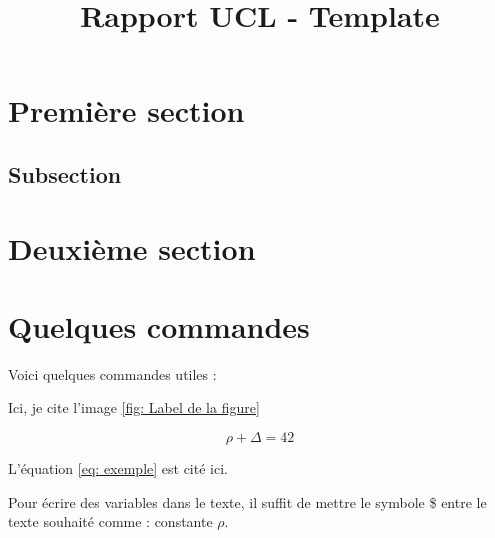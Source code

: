 \documentclass{rapport}
\title{Rapport UCL - Template} %
\begin{document}



        
\fairemarges %
\fairepagedegarde %
\tableofcontents%
\newpage



\section{Première section} 

\lipsum[3-4]%

\subsection{Subsection}

\lipsum[3-4] %

\section{Deuxième section}

\lipsum[3-5] %


\section{Quelques commandes}

Voici quelques commandes utiles :


Ici, je cite l'image \ref{fig: Label de la figure}



\begin{equation} \label{eq: exemple}
\rho + \Delta = 42
\end{equation}

L'équation \ref{eq: exemple} est cité ici. 


Pour écrire des variables dans le texte, il suffit de mettre le symbole \$ entre le texte souhaité comme : constante $\rho$. 
\end{document}
